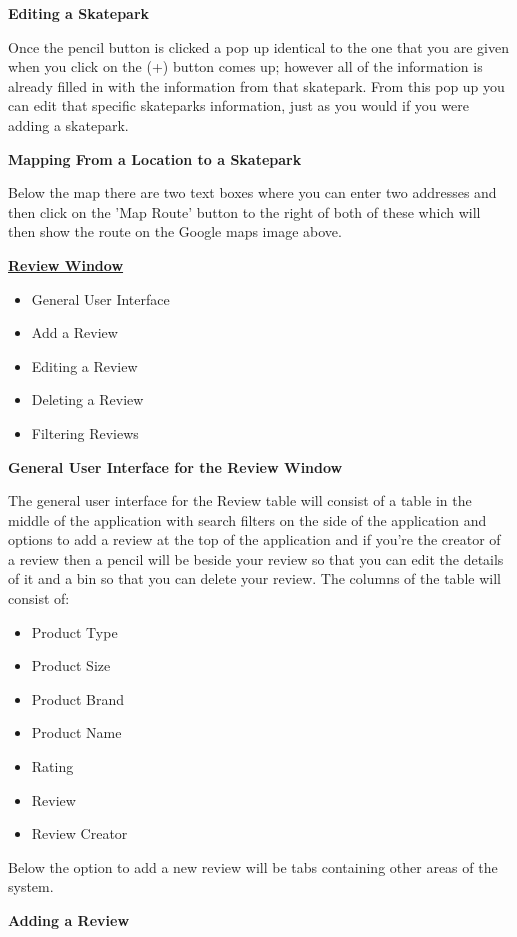 \textbf{Editing a Skatepark}

 Once the pencil button is clicked a pop up identical to the one that you are given when you click on the (+) button comes up; however all of the information is already filled in with the information from that skatepark. From this pop up you can edit that specific skateparks information, just as you would if you were adding a skatepark.


\textbf{Mapping From a Location to a Skatepark} 

Below the map there are two text boxes where you can enter two addresses and then click on the 'Map Route' button to the right of both of these which will then show the route on the Google maps image above.


\underline{\textbf{Review Window}}
\begin{itemize}
\item General User Interface 
\item Add a Review
\item Editing a Review
\item Deleting a Review
\item Filtering Reviews
\end{itemize} 

\textbf{General User Interface for the Review Window}

The general user interface for the Review table will consist of a table in the middle of the application with search filters on the side of the application and options to add a review at the top of the application and if you're the creator of a review then a pencil will be beside your review so that you can edit the details of it and a bin so that you can delete your review. The columns of the table will consist of: 

\begin{itemize}
\item Product Type
\item Product Size
\item Product Brand
\item Product Name 
\item Rating
\item Review
\item Review Creator

\end{itemize} 

Below the option to add a new review will be tabs containing other areas of the system.

\textbf{Adding a Review}


